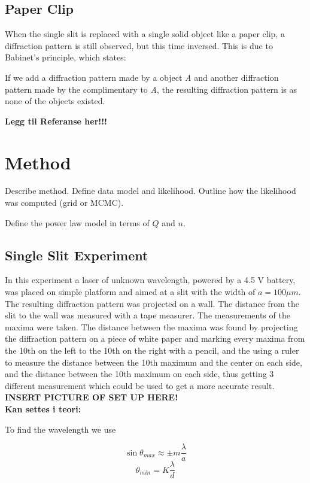 \documentclass{emulateapj}
\begin{document}
\subsection{Paper Clip}
When the single slit is replaced with a single solid object like a paper clip, a diffraction pattern is still observed, but this time inversed. This is due to Babinet's principle, which states: 

If we add a diffraction pattern made by a object \textit{A} and another diffraction pattern made by the complimentary to \textit{A}, the resulting diffraction pattern is as none of the objects existed.

\textbf{Legg til Referanse her!!!}



\section{Method}
\label{sec:method}


Describe method. Define data model and likelihood. Outline how the
likelihood was computed (grid or MCMC).

Define the power law model in terms of $Q$ and $n$. 


\subsection{Single Slit Experiment}
In this experiment a laser of unknown wavelength, powered by a 4.5 V battery, was placed on simple platform and aimed at a slit with the width of  $a = 100\mu m$. The resulting diffraction pattern was projected on a wall. The distance from the slit to the wall was measured with a tape measurer. The measurements of the maxima were taken. The distance between the maxima was found by projecting the diffraction pattern on a piece of white paper and marking every maxima from the 10th on the left to the 10th on the right with a pencil, and the using a ruler to measure the distance between the 10th maximum and the center on each side, and the distance between the 10th maximum on each side, thus getting 3 different measurement which could be used to get a more accurate result.\\

\textbf{INSERT PICTURE OF SET UP HERE!}\\

\textbf{Kan settes i teori:}

To find the wavelength we use 


\begin{equation}
\sin \theta_{max} \approx \pm m\frac{\lambda}{a}
\end{equation}\label{eq:paperClipMax}
\begin{equation}
\theta_{min} = K\frac{\lambda}{d}
\end{equation}\label{eq:diffLimit}
\end{document}
